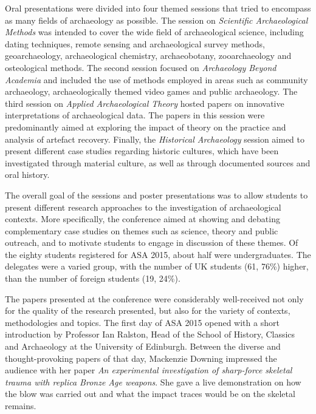 	Oral presentations were divided into four themed sessions that tried to encompass as many fields of archaeology as possible. The session on \textit{Scientific Archaeological Methods} was intended to cover the wide field of archaeological science, including dating techniques, remote sensing and archaeological survey methods, geoarchaeology, archaeological chemistry, archaeobotany, zooarchaeology and osteological methods. The second session focused on \textit{Archaeology Beyond Academia} and included the use of methods employed in areas such as community archaeology, archaeologically themed video games and public archaeology. The third session on \textit{Applied Archaeological Theory} hosted papers on innovative interpretations of archaeological data. The papers in this session were predominantly aimed at exploring the impact of theory on the practice and analysis of artefact recovery. Finally, the \textit{Historical Archaeology} session aimed to present different case studies regarding historic cultures, which have been investigated through material culture, as well as through documented sources and oral history.
	
	The overall goal of the sessions and poster presentations was to allow students to present different research approaches to the investigation of archaeological contexts. More specifically, the conference aimed at showing and debating complementary case studies on themes such as science, theory and public outreach, and to motivate students to engage in discussion of these themes. Of the eighty students registered for ASA 2015, about half were undergraduates. The delegates were a varied group, with the number of UK students (61, 76\%) higher, than the number of foreign students (19, 24\%).
	
	The papers presented at the conference were considerably well-received not only for the quality of the research presented, but also for the variety of contexts, methodologies and topics. The first day of ASA 2015 opened with a short introduction by Professor Ian Ralston, Head of the School of History, Classics and Archaeology at the University of Edinburgh. Between the diverse and thought-provoking papers of that day, Mackenzie Downing impressed the audience with her paper \textit{An experimental investigation of sharp-force skeletal trauma with replica Bronze Age weapons}. She gave a live demonstration on how the blow was carried out and what the impact traces would be on the skeletal remains.
	
